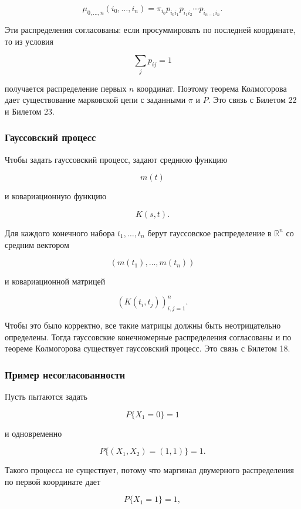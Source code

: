 \documentclass[
  11pt,
  a4paper,
]{article}
\begin{document}
\[
\mu_{0,\ldots,n}(i_0,\ldots,i_n)
=
\pi_{i_0}p_{i_0i_1}p_{i_1i_2}\cdots p_{i_{n-1}i_n}.
\]

Эти распределения согласованы: если просуммировать по последней
координате, то из условия

\[
\sum_j p_{ij}=1
\]

получается распределение первых \(n\) координат. Поэтому теорема
Колмогорова дает существование марковской цепи с заданными \(\pi\) и
\(P\). Это связь с Билетом 22 и Билетом 23.

\subsubsection{Гауссовский
процесс}\label{ux433ux430ux443ux441ux441ux43eux432ux441ux43aux438ux439-ux43fux440ux43eux446ux435ux441ux441}

Чтобы задать гауссовский процесс, задают среднюю функцию

\[
m(t)
\]

и ковариационную функцию

\[
K(s,t).
\]

Для каждого конечного набора \(t_1,\ldots,t_n\) берут гауссовское
распределение в \(\mathbb R^n\) со средним вектором

\[
(m(t_1),\ldots,m(t_n))
\]

и ковариационной матрицей

\[
(K(t_i,t_j))_{i,j=1}^n.
\]

Чтобы это было корректно, все такие матрицы должны быть неотрицательно
определены. Тогда гауссовские конечномерные распределения согласованы и
по теореме Колмогорова существует гауссовский процесс. Это связь с
Билетом 18.

\subsubsection{Пример
несогласованности}\label{ux43fux440ux438ux43cux435ux440-ux43dux435ux441ux43eux433ux43bux430ux441ux43eux432ux430ux43dux43dux43eux441ux442ux438}

Пусть пытаются задать

\[
P\{X_1=0\}=1
\]

и одновременно

\[
P\{(X_1,X_2)=(1,1)\}=1.
\]

Такого процесса не существует, потому что маргинал двумерного
распределения по первой координате дает

\[
P\{X_1=1\}=1,
\]
\end{document}
